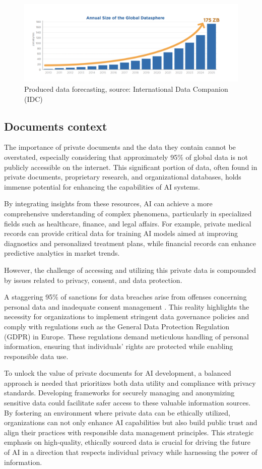 \begin{figure} [H]
    \centering
    \includegraphics[width=0.95\linewidth]{Assets/required_data.png}
    \caption{Produced data forecasting, source: International Data Companion (IDC)}
    \label{fig:enter-label}
\end{figure}
\subsection{Documents context}
The importance of private documents and the data they contain cannot be overstated, especially considering that approximately 95\% of global data is not publicly accessible on the internet. This significant portion of data, often found in private documents, proprietary research, and organizational databases, holds immense potential for enhancing the capabilities of AI systems. 

By integrating insights from these resources, AI can achieve a more comprehensive understanding of complex phenomena, particularly in specialized fields such as healthcare, finance, and legal affairs. For example, private medical records can provide critical data for training AI models aimed at improving diagnostics and personalized treatment plans, while financial records can enhance predictive analytics in market trends.

However, the challenge of accessing and utilizing this private data is compounded by issues related to privacy, consent, and data protection. 

A staggering 95\% of sanctions for data breaches arise from offenses concerning personal data and inadequate consent management \cite{privacyos2024}. This reality highlights the necessity for organizations to implement stringent data governance policies and comply with regulations such as the General Data Protection Regulation (GDPR) in Europe. These regulations demand meticulous handling of personal information, ensuring that individuals' rights are protected while enabling responsible data use.

To unlock the value of private documents for AI development, a balanced approach is needed that prioritizes both data utility and compliance with privacy standards. Developing frameworks for securely managing and anonymizing sensitive data could facilitate safer access to these valuable information sources. By fostering an environment where private data can be ethically utilized, organizations can not only enhance AI capabilities but also build public trust and align their practices with responsible data management principles. This strategic emphasis on high-quality, ethically sourced data is crucial for driving the future of AI in a direction that respects individual privacy while harnessing the power of information.
\newpage

